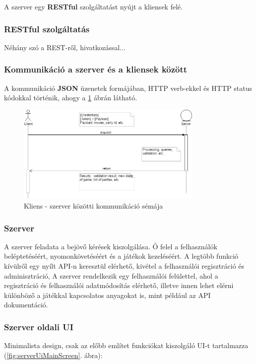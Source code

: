 \documentclass[twoside, a4paper, 12pt]{article}
\begin{document}
A szerver egy \textbf{RESTful} szolgáltatást nyújt a kliensek felé.

\subsubsection{RESTful szolgáltatás}
Néhány szó a REST-ről, hivatkozással...

\subsubsection{Kommunikáció a szerver és a kliensek között}
A kommunikáció \textbf{JSON} üzenetek formájában, HTTP verb-ekkel és HTTP status kódokkal történik, ahogy a \ref{fig:clientServerCommunication} ábrán látható.

\begin{figure}[htbp]
	\centering
	\includegraphics[width=0.8\textwidth]{img/clientServerCommunication.png}
	\caption{Kliens - szerver közötti kommunikáció sémája}
	\label{fig:clientServerCommunication}
\end{figure}


\subsubsection{Szerver}
A szerver feladata a bejövő kérések kiszolgálása. Ő felel a felhasználók beléptetéséért, nyomonkövetéséért és a játékok kezeléséért. A legtöbb funkció kívülről egy nyílt API-n keresztül elérhető, kivétel a felhasználói regisztráció és adminisztráció,
A szerver rendelkezik egy felhasználói felülettel, ahol a regisztráció és felhasználói adatmódosítás elérhető, illetve innen lehet elérni különböző a játékkal kapcsolatos anyagokat is, mint például az API dokumentáció.

\subsubsection{Szerver oldali UI}
Minimalista design, csak az előbb említet funkciókat kiszolgáló UI-t tartalmazza (\ref{fig:serverUiMainScreen}. ábra):
\end{document}
